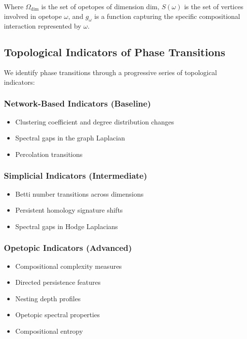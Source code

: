 Where $\Omega_{\text{dim}}$ is the set of opetopes of dimension dim, $S(\omega)$ is the set of vertices involved in opetope $\omega$, and $g_\omega$ is a function capturing the specific compositional interaction represented by $\omega$.

\subsection{Topological Indicators of Phase Transitions}
We identify phase transitions through a progressive series of topological indicators:

\subsubsection{Network-Based Indicators (Baseline)}
\begin{itemize}
  \item Clustering coefficient and degree distribution changes
  \item Spectral gaps in the graph Laplacian
  \item Percolation transitions
\end{itemize}

\subsubsection{Simplicial Indicators (Intermediate)}
\begin{itemize}
  \item Betti number transitions across dimensions
  \item Persistent homology signature shifts
  \item Spectral gaps in Hodge Laplacians
\end{itemize}

\subsubsection{Opetopic Indicators (Advanced)}
\begin{itemize}
  \item Compositional complexity measures
  \item Directed persistence features
  \item Nesting depth profiles
  \item Opetopic spectral properties
  \item Compositional entropy
\end{itemize}

